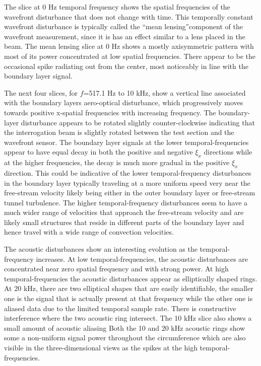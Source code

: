 The slice at 0 Hz temporal frequency shows the spatial frequencies of the wavefront disturbance that does not change with time.
This temporally constant wavefront disturbance is typically called the ``mean lensing''component of the wavefront measurement, since it is has an effect similar to a lens placed in the beam.
The mean lensing slice at 0 Hz shows a mostly axisymmetric pattern with most of its power concentrated at low spatial frequencies.
There appear to be the occasional spike radiating out from the center, most noticeably in line with the boundary layer signal.

The next four slices, for $f$=517.1 Hz to 10 kHz, show a vertical line associated with the boundary layers aero-optical disturbance, which  progressively moves towards positive x-spatial frequencies with increasing frequency.
The boundary-layer disturbance appears to be rotated slightly counter-clockwise indicating that the interrogation beam is slightly rotated between the test section and the wavefront sensor.
The boundary layer signals at the lower temporal-frequencies appear to have equal decay in both the positive and negative $\xi_x$ directions while at the higher frequencies, the decay is much more gradual in the positive $\xi_x$ direction.
This could be indicative of the lower temporal-frequency disturbances in the boundary layer typically traveling at a more uniform speed very near the free-stream velocity likely being either in the outer boundary layer or free-stream tunnel turbulence.
The higher temporal-frequency disturbances seem to have a much wider range of velocities that approach the free-stream velocity and are likely small structures that reside in different parts of the boundary layer and hence travel with a wide range of convection velocities.

The acoustic disturbances show an interesting evolution as the temporal-frequency increases.
At low temporal-frequencies, the acoustic disturbances are concentrated near zero spatial frequency and with strong power.
At high temporal-frequencies the acoustic disturbances appear as elliptically shaped rings.
At 20 kHz, there are two elliptical shapes that are easily identifiable, the smaller one is the signal that is actually present at that frequency while the other one is aliased data due to the limited temporal sample rate.
There is constructive interference where the two acoustic ring intersect.
The 10 kHz slice also shows a small amount of acoustic aliasing
Both the 10 and 20 kHz acoustic rings show some a non-uniform signal power throughout the circumference which are also visible in the three-dimensional views as the spikes at the high temporal-frequencies.

